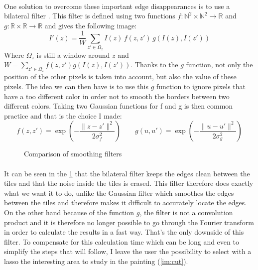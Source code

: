 \documentclass[10pt]{article}
\newcommand{\N}{\mathbb{N}}
\newcommand{\R}{\mathbb{R}}
\begin{document}
	\paragraph{}
	One solution to overcome these important edge disappearances is to use a bilateral filter \cite{bil}. This filter is defined using two functions $f: \N^2 \times \N^2 \rightarrow \R$ and $g: \R \times \R \rightarrow \R$ and gives the following image:
	$$ I'(z) = \dfrac{1}{W} \sum_{z' \in \Omega_{z}} I(z) \, f(z, z') \, g \left( I(z), I(z') \right) $$
	Where $\Omega_{z}$ is still a window around $z$ and $W = \sum_{z' \in \Omega_{z}} f(z, z') g(I(z), I(z'))$. Thanks to the $g$ function, not only the position of the other pixels is taken into account, but also the value of these pixels. The idea we can then have is to use this $g$ function to ignore pixels that have a too different color in order not to smooth the borders between two different colors. Taking two Gaussian functions for f and g is then common practice and that is the choice I made:
	$$ f(z, z') = \exp \left( - \dfrac{\| z - z'\|^2}{2 \sigma_f^2} \right) \qquad g(u, u') = \exp \left( - \dfrac{\| u - u'\|^2}{2 \sigma_g^2} \right) $$
	
	\begin{figure}[h]
		\centering
		\vspace{-2mm}
		\caption{Comparison of smoothing filters}
		\label{im:smooths}
	\end{figure}
	\vspace{-2mm}

	\paragraph{}
	It can be seen in the \figurename \ref{im:smooths} that the bilateral filter keeps the edges clean between the tiles and that the noise inside the tiles is erased. This filter therefore does exactly what we want it to do, unlike the Gaussian filter which smoothes the edges between the tiles and therefore makes it difficult to accurately locate the edges. On the other hand because of the function $g$, the filter is not a convolution product and it is therefore no longer possible to go through the Fourier transform in order to calculate the results in a fast way. That's the only downside of this filter. To compensate for this calculation time which can be long and even to simplify the steps that will follow, I leave the user the possibility to select with a lasso the interesting area to study in the painting (\figurename \ref{im:cut}).
	
\end{document}
